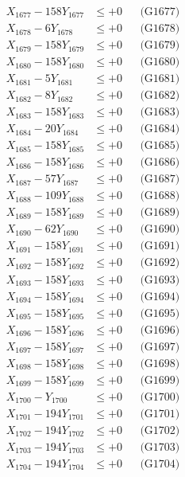 \documentclass[a4paper,10pt]{article}
\begin{document}
{\begin{align}
X_{1677} - 158Y_{1677} &\leq +0 && \text{(G1677)} \\
X_{1678} - 6Y_{1678} &\leq +0 && \text{(G1678)} \\
X_{1679} - 158Y_{1679} &\leq +0 && \text{(G1679)} \\
X_{1680} - 158Y_{1680} &\leq +0 && \text{(G1680)} \\
\allowbreak
X_{1681} - 5Y_{1681} &\leq +0 && \text{(G1681)} \\
X_{1682} - 8Y_{1682} &\leq +0 && \text{(G1682)} \\
X_{1683} - 158Y_{1683} &\leq +0 && \text{(G1683)} \\
X_{1684} - 20Y_{1684} &\leq +0 && \text{(G1684)} \\
X_{1685} - 158Y_{1685} &\leq +0 && \text{(G1685)} \\
X_{1686} - 158Y_{1686} &\leq +0 && \text{(G1686)} \\
X_{1687} - 57Y_{1687} &\leq +0 && \text{(G1687)} \\
X_{1688} - 109Y_{1688} &\leq +0 && \text{(G1688)} \\
X_{1689} - 158Y_{1689} &\leq +0 && \text{(G1689)} \\
X_{1690} - 62Y_{1690} &\leq +0 && \text{(G1690)} \\
\allowbreak
X_{1691} - 158Y_{1691} &\leq +0 && \text{(G1691)} \\
X_{1692} - 158Y_{1692} &\leq +0 && \text{(G1692)} \\
X_{1693} - 158Y_{1693} &\leq +0 && \text{(G1693)} \\
X_{1694} - 158Y_{1694} &\leq +0 && \text{(G1694)} \\
X_{1695} - 158Y_{1695} &\leq +0 && \text{(G1695)} \\
X_{1696} - 158Y_{1696} &\leq +0 && \text{(G1696)} \\
X_{1697} - 158Y_{1697} &\leq +0 && \text{(G1697)} \\
X_{1698} - 158Y_{1698} &\leq +0 && \text{(G1698)} \\
X_{1699} - 158Y_{1699} &\leq +0 && \text{(G1699)} \\
X_{1700} - Y_{1700} &\leq +0 && \text{(G1700)} \\
\allowbreak
X_{1701} - 194Y_{1701} &\leq +0 && \text{(G1701)} \\
X_{1702} - 194Y_{1702} &\leq +0 && \text{(G1702)} \\
X_{1703} - 194Y_{1703} &\leq +0 && \text{(G1703)} \\
X_{1704} - 194Y_{1704} &\leq +0 && \text{(G1704)} \\

\end{align}}
\end{document}
